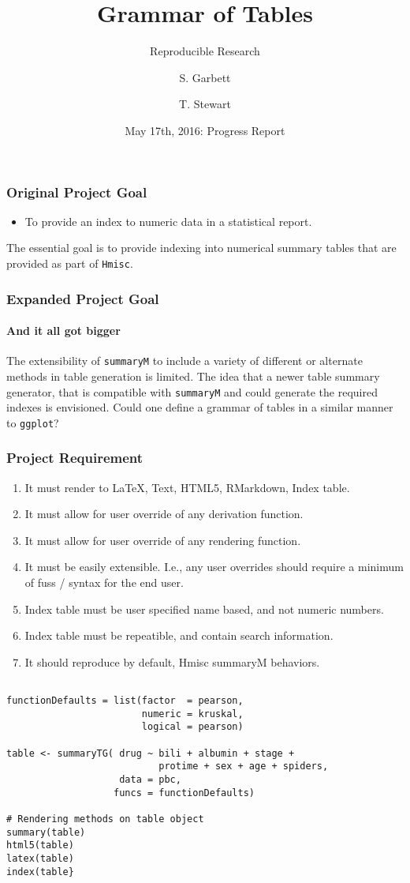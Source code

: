 \documentclass{beamer}
\begin{document}
  
  \title[Grammar of Tables]{Grammar of Tables}
  \subtitle{Reproducible Research}
  \author[S. Garbett, T. Stewart]{S. Garbett \and T. Stewart}
  \date[]{May 17th, 2016: Progress Report}
  
  \frame{\titlepage}
  \begin{frame}
    \frametitle{Original Project Goal}
    \begin{itemize}
    \item To provide an index to numeric data in a statistical report.
    \end{itemize}
    The essential goal is to provide indexing into numerical summary tables
    that are provided as part of \texttt{Hmisc}.
  \end{frame}
  \begin{frame}
    \frametitle{Expanded Project Goal}
    \framesubtitle{And it all got bigger}
    The extensibility of \texttt{summaryM} to include a variety of different or alternate methods in table generation is limited. The idea that a newer table summary generator, that is compatible with \texttt{summaryM} and could generate the required indexes is envisioned. Could one define a grammar of tables in a similar manner to \texttt{ggplot}?
 \end{frame}
 \begin{frame}
   \frametitle{Project Requirement}
   \begin{enumerate}
     \item It must render to LaTeX, Text, HTML5, RMarkdown, Index table.
     \item It must allow for user override of any derivation function.
     \item It must allow for user override of any rendering function.
     \item It must be easily extensible. I.e., any user overrides should require a minimum of fuss / syntax for the end user.
     \item Index table must be user specified name based, and not numeric numbers.
     \item Index table must be repeatible, and contain search information.
     \item It should reproduce by default, Hmisc summaryM behaviors.
   \end{enumerate}
  \end{frame}
    \begin{verbatim}

functionDefaults = list(factor  = pearson,
                        numeric = kruskal,
                        logical = pearson)

table <- summaryTG( drug ~ bili + albumin + stage + 
                           protime + sex + age + spiders,
                    data = pbc,
                   funcs = functionDefaults)

# Rendering methods on table object
summary(table)
html5(table)
latex(table)
index(table}
    \end{verbatim}
\end{document}
